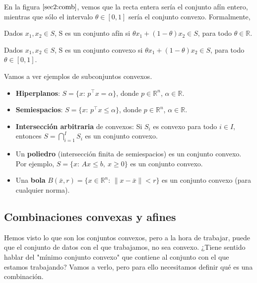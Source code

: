 En la figura $\ref{sec2:comb}$, vemos que la recta entera sería el conjunto afín entero, mientras que sólo el intervalo $\theta \in [0,1]$ sería el conjunto convexo. Formalmente,

\begin{defn}
Dados $x_1,x_2\in S$, S es un conjunto afín si $\theta x_1 + (1-\theta)x_2\in S$, para todo $\theta\in \mathbb{R}$.
\end{defn}

\begin{defn}
Dados $x_1,x_2\in S$, S es un conjunto convexo si $\theta x_1 + (1-\theta)x_2\in S$, para todo $\theta\in [0,1]$.
\end{defn}





Vamos a ver ejemplos de subconjuntos convexos.
\begin{itemize}
\item \textbf{Hiperplanos}: $S=\{x:\, p^\top x = \alpha\}$, donde $p\in\mathbb{R}^n$, $\alpha\in\mathbb{R}$. 

\item \textbf{Semiespacios}: $S=\{x:\, p^\top x \leq \alpha\}$, donde $p\in\mathbb{R}^n$, $\alpha\in\mathbb{R}$. 

\item \textbf{Intersección arbitraria} de convexos: Si $S_i$ es convexo para todo $i\in I$, entonces $S=\bigcap_{i=1}^I S_i$ es un conjunto convexo.

\item Un \textbf{poliedro} (intersección finita de semiespacios) es un conjunto convexo. Por ejemplo, $S=\{x:\, Ax\leq b,\ x\geq 0\}$ es un conjunto convexo.

\item Una \textbf{bola} $B(\bar x,r)=\{x\in\mathbb{R}^n:\, \|x-\bar x\|<r\}$ es un conjunto convexo (para cualquier norma).

\end{itemize}



\subsection{Combinaciones convexas y afines}

Hemos visto lo que son los conjuntos convexos, pero a la hora de trabajar, puede que el conjunto de datos con el que trabajamos, no sea convexo. ¿Tiene sentido hablar del "mínimo conjunto convexo" que contiene al conjunto con el que estamos trabajando? Vamos a verlo, pero para ello necesitamos definir qué es una combinación.

